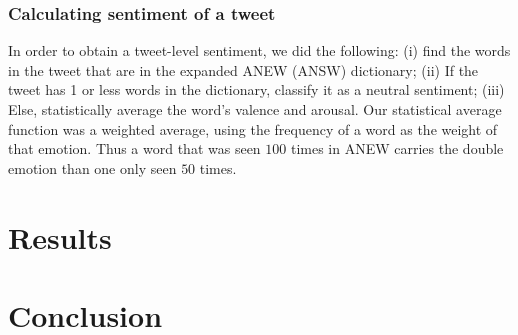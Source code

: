 \documentclass[11pt]{article}
\begin{document}

\subsubsection{Calculating sentiment of a tweet}
In order to obtain a tweet-level sentiment, we did the following: (i) find the words in the tweet that are in the expanded ANEW (ANSW) dictionary; (ii) If the tweet has 1 or less words in the dictionary, classify it as a neutral sentiment; (iii) Else, statistically average the word's valence and arousal. Our statistical average function was a weighted average, using the frequency of a word as the weight of that emotion. Thus a word that was seen $100$ times in ANEW carries the double emotion than one only seen $50$ times. 

\section{Results}


\section{Conclusion}



\end{document}
